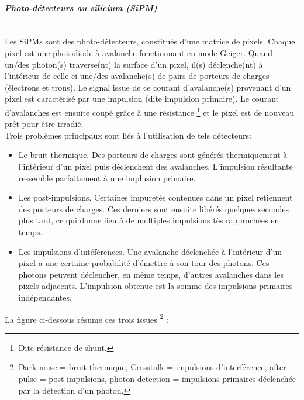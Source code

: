 \documentclass[a4paper, 11pt]{report}%
\begin{document}
\paragraph{\textit{\underline{Photo-d\'etecteurs au silicium (SiPM)}}}
  \leavevmode
  \\
  
  Les SiPMs sont des photo-d\'etecteurs, constitu\'es d'une matrice de pixels. Chaque pixel est une photodiode \`a avalanche fonctionnant en 
  mode Geiger. Quand un/des photon(s) traverse(nt) la surface d'un pixel, il(s) d\'eclenche(nt) \`a l'int\'erieur de celle ci une/des avalanche(s)
  de pairs de porteurs de charges (\'electrons et trous). Le signal issue de ce courant d'avalanche(s) provenant d'un pixel est 
  caract\'eris\'e par une impulsion (dite impulsion primaire).
  Le courant d'avalanches est ensuite coup\'e gr\^ace \`a une r\'esistance \footnote{Dite r\'esistance de shunt.} et le pixel est de nouveau pr\^et pour
  \^etre irradi\'e. 
  \\
  
  Trois probl\`emes principaux sont li\'es \`a l'utilisation de tels d\'etecteurs:
  
  \begin{itemize}
   \item Le bruit thermique. Des porteurs de charges sont g\'en\'er\'es thermiquement \`a l'int\'erieur d'un pixel puis d\'eclenchent des 
   avalanches. L'impulsion r\'esultante ressemble parfaitement \`a une implusion primaire.
   \item Les post-impulsions. Certaines impuret\'es contenues dans un pixel retiennent des porteurs de charges. Ces derniers sont ensuite
   lib\'er\'es quelques secondes plus tard, ce qui donne lieu \`a de multiples impulsions t\`es rapproch\'ees en temps. 
   \item Les impulsions d'int\'ef\'erences. Une avalanche d\'eclench\'ee \`a l'int\'erieur d'un pixel a une certaine probabilit\'e d'\'emettre \`a son 
   tour des photons. Ces photons peuvent d\'eclencher, en m\^eme temps, d'autres avalanches dans les pixels adjacents. L'impulsion obtenue 
   est la somme des impulsions primaires ind\'ependantes. 
  \end{itemize}

  La figure ci-dessous r\'esume ces trois issues \footnote{Dark noise = bruit thermique, Crosstalk = impulsions d'interf\'erence, after pulse 
    = post-impulsions, photon detection = impulsions primaires d\'eclench\'ee par la d\'etection d'un photon.} :
  
\end{document}
